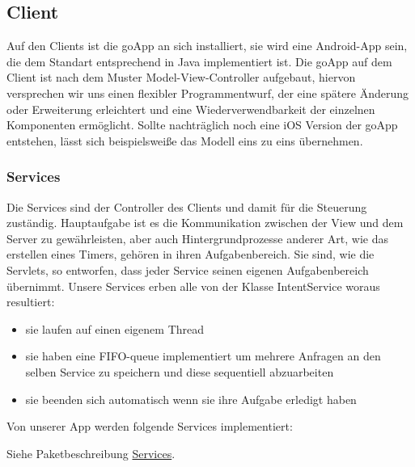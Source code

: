 	\subsection{Client}
	Auf den Clients ist die goApp an sich installiert, sie wird eine Android-App sein, die dem Standart entsprechend in Java implementiert ist.
	Die goApp auf dem Client ist nach dem Muster Model-View-Controller aufgebaut, hiervon versprechen wir uns einen flexibler Programmentwurf, der eine spätere Änderung oder Erweiterung erleichtert und eine Wiederverwendbarkeit der einzelnen Komponenten ermöglicht.
Sollte nachträglich noch eine iOS Version der goApp entstehen, lässt sich beispielsweiße das Modell eins zu eins übernehmen.
	
	\subsubsection{Services}
	Die Services sind der Controller des Clients und damit für die Steuerung zuständig. Hauptaufgabe ist es die Kommunikation zwischen der View und dem Server zu gewährleisten, aber auch Hintergrundprozesse anderer Art, wie das erstellen eines Timers, gehören in ihren Aufgabenbereich.
Sie sind, wie die Servlets, so entworfen, dass jeder Service seinen eigenen Aufgabenbereich übernimmt.
\newline Unsere Services erben alle von der Klasse IntentService woraus resultiert:
\begin{itemize}
\item sie laufen auf einen eigenem Thread
\item sie haben eine FIFO-queue implementiert um mehrere Anfragen an den selben Service zu speichern und diese sequentiell abzuarbeiten
\item sie beenden sich automatisch wenn sie ihre Aufgabe erledigt haben
\end{itemize}

Von unserer App werden folgende Services implementiert:
\newline


\begin {center}
\end {center}
Siehe Paketbeschreibung \hyperlink{controler.service}{Services}.

